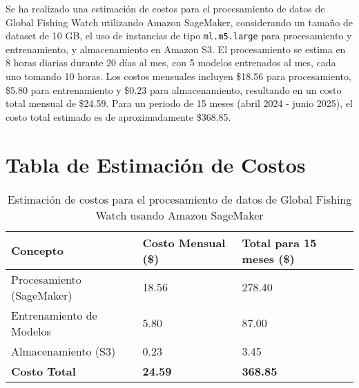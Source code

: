 

Se ha realizado una estimación de costos para el procesamiento de datos de Global Fishing Watch utilizando Amazon SageMaker, considerando un tamaño de dataset de 10 GB, el uso de instancias de tipo \texttt{ml.m5.large} para procesamiento y entrenamiento, y almacenamiento en Amazon S3. El procesamiento se estima en 8 horas diarias durante 20 días al mes, con 5 modelos entrenados al mes, cada uno tomando 10 horas. Los costos mensuales incluyen \$18.56 para procesamiento, \$5.80 para entrenamiento y \$0.23 para almacenamiento, resultando en un costo total mensual de \$24.59. Para un periodo de 15 meses (abril 2024 - junio 2025), el costo total estimado es de aproximadamente \$368.85.

\section{Tabla de Estimación de Costos}

\begin{table}[h!]
\centering
\caption{Estimación de costos para el procesamiento de datos de Global Fishing Watch usando Amazon SageMaker}
\begin{tabular}{|m{6cm}|m{4cm}|m{4cm}|}
\hline
\textbf{Concepto} & \textbf{Costo Mensual (\$)} & \textbf{Total para 15 meses (\$)} \\
\hline
Procesamiento (SageMaker) & 18.56 & 278.40 \\
\hline
Entrenamiento de Modelos & 5.80 & 87.00 \\
\hline
Almacenamiento (S3) & 0.23 & 3.45 \\
\hline
\textbf{Costo Total} & \textbf{24.59} & \textbf{368.85} \\
\hline
\end{tabular}
\end{table}

